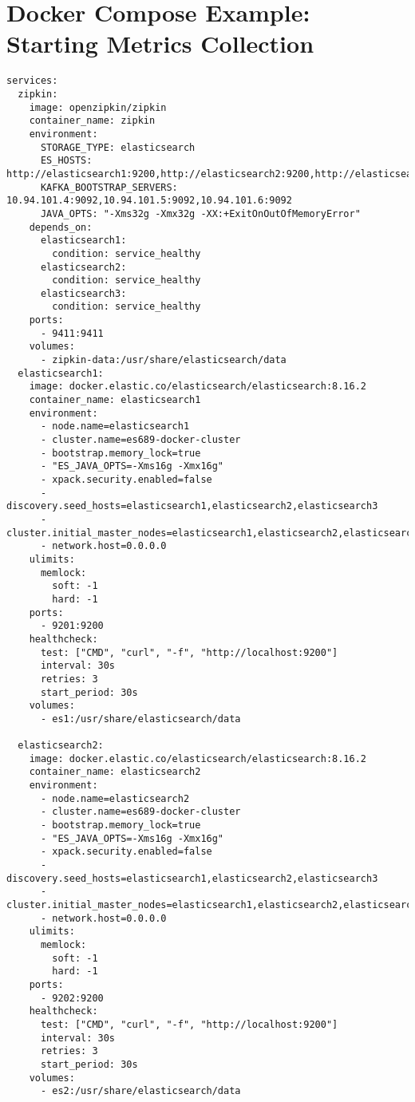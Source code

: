 \section{Docker Compose Example: Starting Metrics Collection}


\begin{lstlisting}[frame=tb,caption={Docker compose for metrics collection},label=lst:dockercomposemetrics]
services:
  zipkin:
    image: openzipkin/zipkin
    container_name: zipkin
    environment:
      STORAGE_TYPE: elasticsearch
      ES_HOSTS: http://elasticsearch1:9200,http://elasticsearch2:9200,http://elasticsearch3:9200
      KAFKA_BOOTSTRAP_SERVERS: 10.94.101.4:9092,10.94.101.5:9092,10.94.101.6:9092
      JAVA_OPTS: "-Xms32g -Xmx32g -XX:+ExitOnOutOfMemoryError"
    depends_on:
      elasticsearch1:
        condition: service_healthy
      elasticsearch2:
        condition: service_healthy
      elasticsearch3:
        condition: service_healthy
    ports:
      - 9411:9411
    volumes:
      - zipkin-data:/usr/share/elasticsearch/data
  elasticsearch1:
    image: docker.elastic.co/elasticsearch/elasticsearch:8.16.2
    container_name: elasticsearch1
    environment:
      - node.name=elasticsearch1
      - cluster.name=es689-docker-cluster
      - bootstrap.memory_lock=true
      - "ES_JAVA_OPTS=-Xms16g -Xmx16g"
      - xpack.security.enabled=false
      - discovery.seed_hosts=elasticsearch1,elasticsearch2,elasticsearch3
      - cluster.initial_master_nodes=elasticsearch1,elasticsearch2,elasticsearch3
      - network.host=0.0.0.0
    ulimits:
      memlock:
        soft: -1
        hard: -1
    ports:
      - 9201:9200
    healthcheck:
      test: ["CMD", "curl", "-f", "http://localhost:9200"]
      interval: 30s
      retries: 3
      start_period: 30s
    volumes:
      - es1:/usr/share/elasticsearch/data

  elasticsearch2:
    image: docker.elastic.co/elasticsearch/elasticsearch:8.16.2
    container_name: elasticsearch2
    environment:
      - node.name=elasticsearch2
      - cluster.name=es689-docker-cluster
      - bootstrap.memory_lock=true
      - "ES_JAVA_OPTS=-Xms16g -Xmx16g"
      - xpack.security.enabled=false
      - discovery.seed_hosts=elasticsearch1,elasticsearch2,elasticsearch3
      - cluster.initial_master_nodes=elasticsearch1,elasticsearch2,elasticsearch3
      - network.host=0.0.0.0
    ulimits:
      memlock:
        soft: -1
        hard: -1
    ports:
      - 9202:9200
    healthcheck:
      test: ["CMD", "curl", "-f", "http://localhost:9200"]
      interval: 30s
      retries: 3
      start_period: 30s
    volumes:
      - es2:/usr/share/elasticsearch/data


\end{lstlisting}
